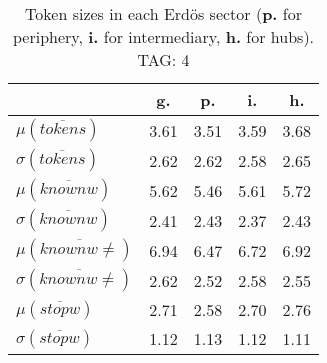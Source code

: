 \begin{table}[h!]
\begin{center}
\begin{tabular}{| l | c | c | c | c |}\hline
 & g. & p. & i. & h. \\\hline
$\mu(\overline{tokens})$ & 3.61  & 3.51  & 3.59  & 3.68 \\\hline
$\sigma(\overline{tokens})$ & 2.62  & 2.62  & 2.58  & 2.65 \\\hline
$\mu(\overline{knownw})$ & 5.62  & 5.46  & 5.61  & 5.72 \\\hline
$\sigma(\overline{knownw})$ & 2.41  & 2.43  & 2.37  & 2.43 \\\hline
$\mu(\overline{knownw \neq})$ & 6.94  & 6.47  & 6.72  & 6.92 \\\hline
$\sigma(\overline{knownw \neq})$ & 2.62  & 2.52  & 2.58  & 2.55 \\\hline
$\mu(\overline{stopw})$ & 2.71  & 2.58  & 2.70  & 2.76 \\\hline
$\sigma(\overline{stopw})$ & 1.12  & 1.13  & 1.12  & 1.11 \\\hline
\end{tabular}
\caption{Token sizes in each Erd\"os sector ({{\bf p.}} for periphery, {{\bf i.}} for intermediary, {{\bf h.}} for hubs). TAG: 4}
\end{center}
\end{table}